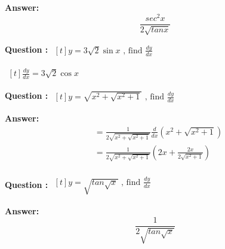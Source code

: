 \documentclass{beamer}
\begin{document}

\frame
{
\textbf{Answer:}
\begin{equation} \nonumber
\frac{sec^2x}{2\sqrt{tan x}}
\end{equation}

}




\frame
{
\textbf{Question :} 
$\begin{aligned}[t] 
y= 3\sqrt{2}\sin x  \text{\ , \  \ find \ \  } \frac{dy}{dx}
\end{aligned}$
}


\frame
{
$\begin{aligned}[t] 
 \frac{dy}{dx}= 3\sqrt{2}\cos x 
\end{aligned}$

}


\frame
{
\textbf{Question :} 
$\begin{aligned}[t] 
y= \sqrt{x^2 + \sqrt{x^2 +1}}  \text{\ , \  \ find \ \  } \frac{dy}{dx}
\end{aligned}$
}

\large
\frame
{
\textbf{Answer:}
\begin{align*} \nonumber
&= \frac{1}{2\sqrt{x^2 + \sqrt{x^2 +1}}} \frac{d }{dx}\left( {x^2 + \sqrt{x^2 +1}} \right) \\
&= \frac{1}{2\sqrt{x^2 + \sqrt{x^2 +1}}} \left( {2x + \frac{2x}{2\sqrt{x^2 +1}}} \right) \\
\end{align*}

}



\frame
{
\textbf{Question :} 
$\begin{aligned}[t] 
y= \sqrt{tan \sqrt{x} }  \text{\ , \  \ find \ \  } \frac{dy}{dx}
\end{aligned}$
}


\frame
{
\textbf{Answer:}
\begin{equation} \nonumber
\frac{1}{2\sqrt{tan \sqrt{x} }}
\end{equation}

}

\end{document}

